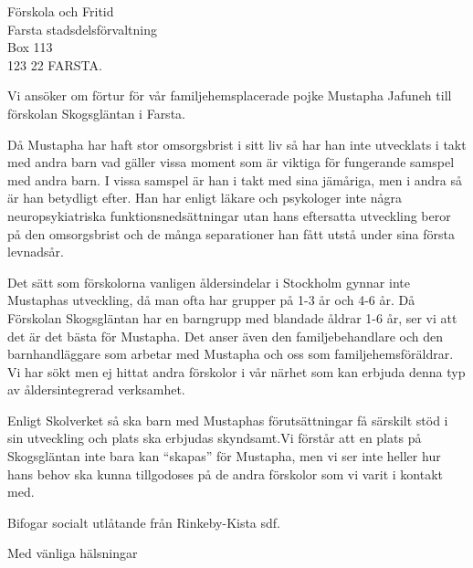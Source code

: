 \documentclass[a4paper]{letter}
\begin{document}
\signature{Gertrud Kleberg \hspace{0.9cm} Linus Nordberg}
\begin{letter}{Förskola och Fritid \\ Farsta stadsdelsförvaltning \\ Box 113 \\ 123 22 FARSTA}.
\address{Gertrud Kleberg, Linus Nordberg \\ Grumsgatan 2 \\ 123 44 FARSTA}

\opening{} 

Vi ansöker om förtur för vår familjehemsplacerade pojke Mustapha
Jafuneh till förskolan Skogsgläntan i Farsta.

Då Mustapha har haft stor omsorgsbrist i sitt liv så har han inte
utvecklats i takt med andra barn vad gäller vissa moment som är
viktiga för fungerande samspel med andra barn. I vissa samspel är han
i takt med sina jämåriga, men i andra så är han betydligt efter. Han
har enligt läkare och psykologer inte några neuropsykiatriska
funktionsnedsättningar utan hans eftersatta utveckling beror på den
omsorgsbrist och de många separationer han fått utstå under sina
första levnadsår.

Det sätt som förskolorna vanligen åldersindelar i Stockholm gynnar
inte Mustaphas utveckling, då man ofta har grupper på 1-3 år och 4-6
år. Då Förskolan Skogsgläntan har en barngrupp med blandade åldrar 1-6
år, ser vi att det är det bästa för Mustapha. Det anser även den
familjebehandlare och den barnhandläggare som arbetar med Mustapha och
oss som familjehemsföräldrar. Vi har sökt men ej hittat andra
förskolor i vår närhet som kan erbjuda denna typ av åldersintegrerad
verksamhet.

Enligt Skolverket så ska barn med Mustaphas förutsättningar få
särskilt stöd i sin utveckling och plats ska erbjudas skyndsamt.Vi
förstår att en plats på Skogsgläntan inte bara kan ``skapas'' för
Mustapha, men vi ser inte heller hur hans behov ska kunna tillgodoses
på de andra förskolor som vi varit i kontakt med.

Bifogar socialt utlåtande från Rinkeby-Kista sdf.

\closing{Med vänliga hälsningar}

\end{letter}
\end{document}
